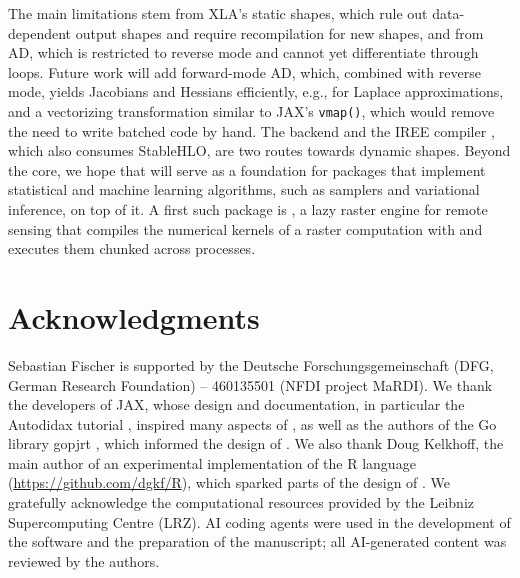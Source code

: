 The main limitations stem from XLA's static shapes, which rule out data-dependent output shapes and require recompilation for new shapes, and from AD, which is restricted to reverse mode and cannot yet differentiate through loops.
Future work will add forward-mode AD, which, combined with reverse mode, yields Jacobians and Hessians efficiently, e.g., for Laplace approximations, and a vectorizing transformation similar to JAX's \texttt{vmap()}, which would remove the need to write batched code by hand.
The  backend and the IREE compiler \citep{ref-iree}, which also consumes StableHLO, are two routes towards dynamic shapes.
Beyond the core, we hope that  will serve as a foundation for packages that implement statistical and machine learning algorithms, such as samplers and variational inference, on top of it.
A first such package is  \citep{ref-garry}, a lazy raster engine for remote sensing that compiles the numerical kernels of a raster computation with  and executes them chunked across processes.

\section*{Acknowledgments}\label{acknowledgments}

Sebastian Fischer is supported by the Deutsche Forschungsgemeinschaft (DFG, German Research Foundation) -- 460135501 (NFDI project MaRDI).
We thank the developers of JAX, whose design and documentation, in particular the Autodidax tutorial \citep{ref-autodidax}, inspired many aspects of , as well as the authors of the Go library gopjrt \citep{ref-gopjrt}, which informed the design of .
We also thank Doug Kelkhoff, the main author of an experimental implementation of the R language (\url{https://github.com/dgkf/R}), which sparked parts of the design of .
We gratefully acknowledge the computational resources provided by the Leibniz Supercomputing Centre (LRZ).
AI coding agents were used in the development of the software and the preparation of the manuscript; all AI-generated content was reviewed by the authors.



\address{%
Sebastian Fischer\\
LMU MunichMunich Center for Machine Learning (MCML)\\%
Department of Statistics\\ Ludwig-Maximilians-Universität München\\ Ludwigstr. 33, 80539 Munich, Germany\\
%
%
\textit{ORCiD: \href{https://orcid.org/0000-0002-9609-3197}{0000-0002-9609-3197}}\\%
\href{mailto:sebastian.fischer@stat.uni-muenchen.de}{\nolinkurl{sebastian.fischer@stat.uni-muenchen.de}}%
}

